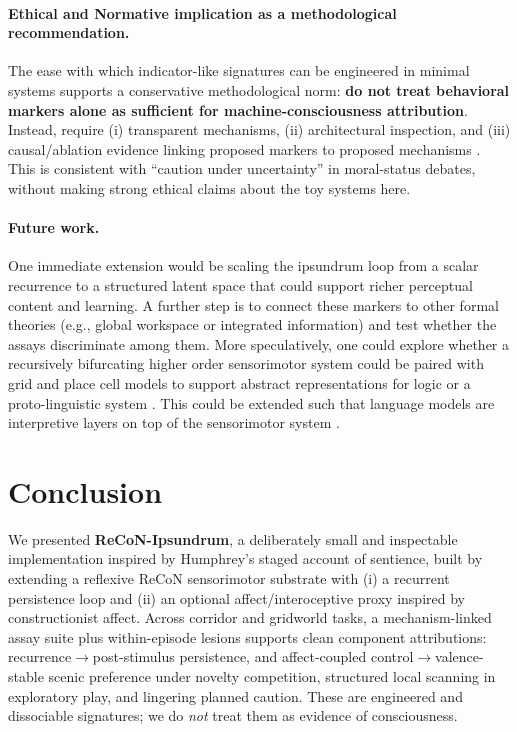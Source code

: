 \documentclass[letterpaper]{article} %
\begin{document}
\paragraph{Ethical and Normative implication as a methodological recommendation.}
The ease with which indicator-like signatures can be engineered in minimal systems supports a conservative methodological norm: \textbf{do not treat behavioral markers alone as sufficient for machine-consciousness attribution}.
Instead, require (i) transparent mechanisms, (ii) architectural inspection, and (iii) causal/ablation evidence linking proposed markers to proposed mechanisms \citep{ButlinEtAl2025Indicators}.
This is consistent with ``caution under uncertainty'' in moral-status debates, without making strong ethical claims about the toy systems here.

\paragraph{Future work.}
One immediate extension would be scaling the ipsundrum loop from a scalar recurrence to a structured latent space that could support richer perceptual content and learning.
A further step is to connect these markers to other formal theories (e.g., global workspace or integrated information) and test whether the assays discriminate among them.
More speculatively, one could explore whether a recursively bifurcating higher order sensorimotor system could be paired with grid and place cell models to support abstract representations for
logic or a proto-linguistic system \citep{OkeefeDostrovsky1971SpatialMap,HaftingEtAl2005Microstructure,ConstantinescuEtAl2016Gridlike,BehrensEtAl2018CognitiveMap,BaninoEtAl2018VectorBasedNav,WhittingtonEtAl2020TEM,WhittingtonEtAl2022RelatingTransformers}. This could be extended such that language models are interpretive layers on top of the sensorimotor system \citep{Harnad1990SymbolGrounding,AhnEtAl2022SayCan,DriessEtAl2023PaLME,BrohanEtAl2023RT2}.
\section{Conclusion}
We presented \textbf{ReCoN-Ipsundrum}, a deliberately small and inspectable implementation inspired by Humphrey's staged account of sentience, built by extending a reflexive ReCoN sensorimotor substrate with (i) a recurrent persistence loop and (ii) an optional affect/interoceptive proxy inspired by constructionist affect.
Across corridor and gridworld tasks, a mechanism-linked assay suite plus within-episode lesions supports clean component attributions: recurrence$\rightarrow$post-stimulus persistence, and affect-coupled control$\rightarrow$valence-stable scenic preference under novelty competition, structured local scanning in exploratory play, and lingering planned caution.
These are engineered and dissociable signatures; we do \emph{not} treat them as evidence of consciousness.
\end{document}

